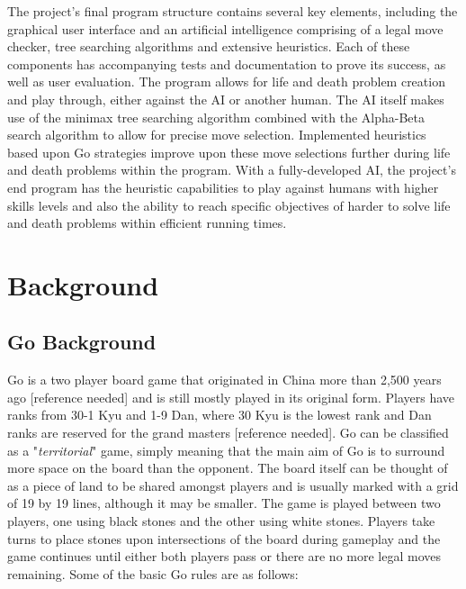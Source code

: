 \documentclass{l3proj}
\begin{document}
The project's final program structure contains several key elements, including the graphical user interface and an artificial intelligence comprising of a legal move checker, tree searching algorithms and extensive heuristics. Each of these components has accompanying tests and documentation to prove its success, as well as user evaluation. The program allows for life and death problem creation and play through, either against the AI or another human. The AI itself makes use of the minimax tree searching algorithm combined with the Alpha-Beta search algorithm to allow for precise move selection. Implemented heuristics based upon Go strategies improve upon these move selections further during life and death problems within the program. With a fully-developed AI, the project's end program has the heuristic capabilities to play against humans with higher skills levels and also the ability to reach specific objectives of harder to solve life and death problems within efficient running times.

\chapter{Background}
\label{background}

\section{Go Background}

Go is a two player board game that originated in China more than 2,500 years ago [reference needed] and is still mostly played in its original form.  Players have ranks from 30-1 Kyu and 1-9 Dan, where 30 Kyu is the lowest rank and Dan ranks are reserved for the grand masters [reference needed]. Go can be classified as a "\textit{territorial}" game, simply meaning that the main aim of Go is to surround more space on the board than the opponent. The board itself can be thought of as a piece of land to be shared amongst players and is usually marked with a grid of 19 by 19 lines, although it may be smaller. The game is played between two players, one using black stones and the other using white stones. Players take turns to place stones upon intersections of the board during gameplay and the game continues until either both players pass or there are no more legal moves remaining.  Some of the basic Go rules are as follows:
\end{document}
